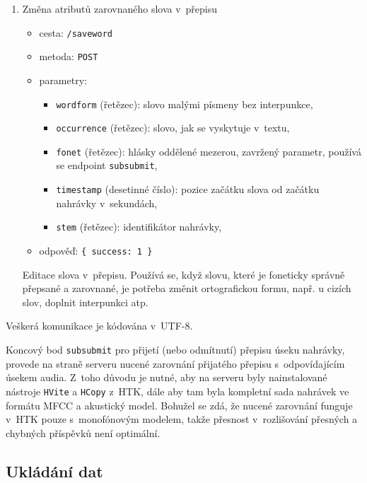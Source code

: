 \begin{enumerate}
{    Tento endpoint momentálně nová verze webového rozhraní nepoužívá, byl
    zamýšlen jako vodítko pro uživatele při výběru nahrávky pro přepis a
    pro navození soutěživého ducha.
}
\item{
    Změna atributů zarovnaného slova v~přepisu \\
    \begin{itemize}
        \item{cesta: \texttt{/saveword}}
        \item{metoda: \texttt{POST}}
        \item{parametry:
            \begin{itemize}
                \item{\texttt{wordform} (řetězec): slovo malými písmeny bez interpunkce,}
                \item{\texttt{occurrence} (řetězec): slovo, jak se vyskytuje v~textu,}
                \item{\texttt{fonet} (řetězec): hlásky oddělené mezerou, zavržený
                parametr, používá se endpoint \texttt{subsubmit},}
                \item{\texttt{timestamp} (desetinné číslo): pozice začátku slova od
                začátku nahrávky v~sekundách,}
                \item{\texttt{stem} (řetězec): identifikátor nahrávky,}
            \end{itemize}
        }
        \item{odpověď: \texttt{\{ success: 1 \}}}
    \end{itemize}
    Editace slova v~přepisu. Používá se, když slovu, které je foneticky správně
    přepsané a zarovnané, je potřeba změnit ortografickou formu, např. u cizích
    slov, doplnit interpunkci atp.
}
\end{enumerate}

Veškerá komunikace je kódována v~UTF-8.

Koncový bod \texttt{subsubmit} pro přijetí (nebo odmítnutí) přepisu úseku
nahrávky, provede na straně serveru nucené zarovnání přijatého přepisu
s~odpovídajícím úsekem audia. Z~toho důvodu je nutné, aby na serveru byly
nainstalované nástroje \texttt{HVite} a \texttt{HCopy} z~HTK, dále aby tam byla
kompletní sada nahrávek ve formátu MFCC a akustický model. Bohužel se zdá, že
nucené zarovnání funguje v~HTK pouze s~monofónovým modelem, takže přesnost
v~rozlišování přesných a chybných příspěvků není optimální.

\subsection{Ukládání dat}

